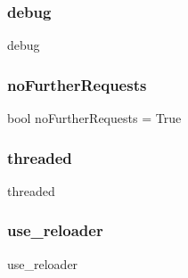 \hypertarget{namespaceweb_back_a0514aabed091ee5e2f35766eb01eced6}{}\label{namespaceweb_back_a0514aabed091ee5e2f35766eb01eced6} 
\subsubsection{\texorpdfstring{debug}{debug}}
{\footnotesize\ttfamily debug}

\hypertarget{namespaceweb_back_a54be33696aa638ea93d5b7bd190da106}{}\label{namespaceweb_back_a54be33696aa638ea93d5b7bd190da106} 
\subsubsection{\texorpdfstring{no\+Further\+Requests}{noFurtherRequests}}
{\footnotesize\ttfamily bool no\+Further\+Requests = True}

\hypertarget{namespaceweb_back_a47e597222ad8ae582ae1306ab3d3d395}{}\label{namespaceweb_back_a47e597222ad8ae582ae1306ab3d3d395} 
\subsubsection{\texorpdfstring{threaded}{threaded}}
{\footnotesize\ttfamily threaded}

\hypertarget{namespaceweb_back_a33f3d888c60d659e953c90c18f532678}{}\label{namespaceweb_back_a33f3d888c60d659e953c90c18f532678} 
\subsubsection{\texorpdfstring{use\+\_\+reloader}{use\_reloader}}
{\footnotesize\ttfamily use\+\_\+reloader}

